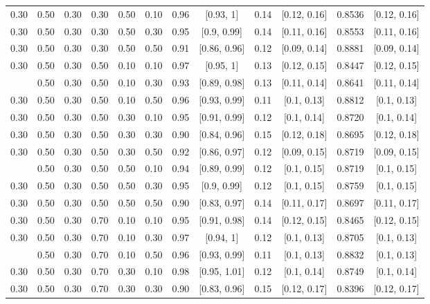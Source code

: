 \documentclass[
  11pt,
]{article}
\begin{document}
\begin{landscape}
\begin{ThreePartTable}
\begin{longtable}[t]{cccccccccccc}
0.30 & 0.50 & 0.30 & 0.30 & 0.50 & 0.10 & 0.96 & {}[0.93, 1] & 0.14 & {}[0.12, 0.16] & 0.8536 & {}[0.12, 0.16]\\
0.30 & 0.50 & 0.30 & 0.30 & 0.50 & 0.30 & 0.95 & {}[0.9, 0.99] & 0.14 & {}[0.11, 0.16] & 0.8553 & {}[0.11, 0.16]\\
0.30 & 0.50 & 0.30 & 0.30 & 0.50 & 0.50 & 0.91 & {}[0.86, 0.96] & 0.12 & {}[0.09, 0.14] & 0.8881 & {}[0.09, 0.14]\\
0.30 & 0.50 & 0.30 & 0.50 & 0.10 & 0.10 & 0.97 & {}[0.95, 1] & 0.13 & {}[0.12, 0.15] & 0.8447 & {}[0.12, 0.15]\\
\addlinespace
0.30 & 0.50 & 0.30 & 0.50 & 0.10 & 0.30 & 0.93 & {}[0.89, 0.98] & 0.13 & {}[0.11, 0.14] & 0.8641 & {}[0.11, 0.14]\\
0.30 & 0.50 & 0.30 & 0.50 & 0.10 & 0.50 & 0.96 & {}[0.93, 0.99] & 0.11 & {}[0.1, 0.13] & 0.8812 & {}[0.1, 0.13]\\
0.30 & 0.50 & 0.30 & 0.50 & 0.30 & 0.10 & 0.95 & {}[0.91, 0.99] & 0.12 & {}[0.1, 0.14] & 0.8720 & {}[0.1, 0.14]\\
0.30 & 0.50 & 0.30 & 0.50 & 0.30 & 0.30 & 0.90 & {}[0.84, 0.96] & 0.15 & {}[0.12, 0.18] & 0.8695 & {}[0.12, 0.18]\\
0.30 & 0.50 & 0.30 & 0.50 & 0.30 & 0.50 & 0.92 & {}[0.86, 0.97] & 0.12 & {}[0.09, 0.15] & 0.8719 & {}[0.09, 0.15]\\
\addlinespace
0.30 & 0.50 & 0.30 & 0.50 & 0.50 & 0.10 & 0.94 & {}[0.89, 0.99] & 0.12 & {}[0.1, 0.15] & 0.8719 & {}[0.1, 0.15]\\
0.30 & 0.50 & 0.30 & 0.50 & 0.50 & 0.30 & 0.95 & {}[0.9, 0.99] & 0.12 & {}[0.1, 0.15] & 0.8759 & {}[0.1, 0.15]\\
0.30 & 0.50 & 0.30 & 0.50 & 0.50 & 0.50 & 0.90 & {}[0.83, 0.97] & 0.14 & {}[0.11, 0.17] & 0.8697 & {}[0.11, 0.17]\\
0.30 & 0.50 & 0.30 & 0.70 & 0.10 & 0.10 & 0.95 & {}[0.91, 0.98] & 0.14 & {}[0.12, 0.15] & 0.8465 & {}[0.12, 0.15]\\
0.30 & 0.50 & 0.30 & 0.70 & 0.10 & 0.30 & 0.97 & {}[0.94, 1] & 0.12 & {}[0.1, 0.13] & 0.8705 & {}[0.1, 0.13]\\
\addlinespace
0.30 & 0.50 & 0.30 & 0.70 & 0.10 & 0.50 & 0.96 & {}[0.93, 0.99] & 0.11 & {}[0.1, 0.13] & 0.8832 & {}[0.1, 0.13]\\
0.30 & 0.50 & 0.30 & 0.70 & 0.30 & 0.10 & 0.98 & {}[0.95, 1.01] & 0.12 & {}[0.1, 0.14] & 0.8749 & {}[0.1, 0.14]\\
0.30 & 0.50 & 0.30 & 0.70 & 0.30 & 0.30 & 0.90 & {}[0.83, 0.96] & 0.15 & {}[0.12, 0.17] & 0.8396 & {}[0.12, 0.17]\\

\end{longtable}
\end{ThreePartTable}
\end{landscape}
\end{document}
